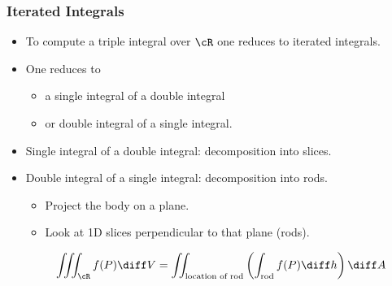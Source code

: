 \begin{frame}
\frametitle{Iterated Integrals}
\begin{itemize}
\item To compute a triple integral over $\cR$ one reduces to iterated integrals.
\item<2-> One reduces to 
\begin{itemize}
\item<2-> a \alert<4>{single integral of a double integral}
\item<3-> or double integral of a single integral.
\end{itemize} 
\item<4-> Single integral of a double integral: \alert<4>{decomposition into slices}.
\item Double integral of a single integral: decomposition into rods.
\begin{itemize}
\item Project the body on a plane.
\item Look at 1D slices perpendicular to that plane (rods).
\end{itemize}
\[\iiint_{\cR}f(P) \diff V = \iint_{\text{location of rod}} \left(\int_{\text{rod}} f(P)  \diff h\right)  \diff A
\]
\end{itemize}
\end{frame}